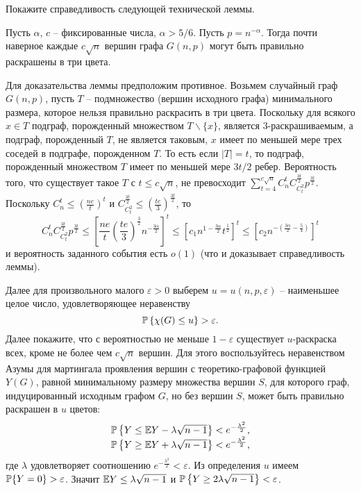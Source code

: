 \begin{ordre}
Покажите справедливость следующей технической леммы.

\begin{lemma}
Пусть $\alpha $, $c$ -- фиксированные числа, $\alpha > 5/6$. Пусть 
$p=n^{-\alpha }$. Тогда почти наверное каждые $c \sqrt n $ вершин графа 
$G(n,p)$ могут быть правильно раскрашены в три цвета.
\end{lemma}

Для доказательства леммы предположим противное. Возьмем случайный граф
$G(n,p)$, пусть $T$ -- подмножество (вершин исходного графа) минимального размера, которое нельзя правильно раскрасить в три цвета. Поскольку для всякого $x\in T$ подграф, порожденный множеством $T\backslash \{x\}$, является 3-раскрашиваемым, а подграф, порожденный $T$, не является таковым, $x$ имеет по меньшей мере трех соседей в подграфе, порожденном $T$. То есть если $\vert T\vert =t$, то подграф, порожденный множеством $T$ имеет по меньшей мере $3t/2$ ребер. Вероятность того, что существует такое $T$ с 
$t\le c\sqrt n $, не превосходит $\sum\limits_{t=4}^{c\sqrt n } {C_n^t
C_{C_t^2 }^{\frac{3t}{2}} p^{\frac{3t}{2}}} $. 
Поскольку $C_n^t \le \left( 
{\frac{ne}{t}} \right)^t$ и $C_{C_t^2 }^{\frac{3t}{2}} \le \left( 
{\frac{te}{3}} \right)^{\frac{3t}{2}}$, то 
\[
C_n^t C_{C_t^2 }^{\frac{3t}{2}} 
p^{\frac{3t}{2}}\le \left[ {\frac{ne}{t}\left( {\frac{te}{3}} 
\right)^{\frac{3}{2}}n^{-\frac{3\alpha }{2}}} \right]^t\le \left[ {c_1
n^{1-\frac{3\alpha }{2}}t^{\frac{1}{2}}} \right]^t\le \left[ {c_2 n^{-\left( 
{\frac{3\alpha }{2}-\frac{5}{4}} \right)}} \right]^t
\]
и вероятность заданного события есть $o(1)$ (что и доказывает справедливость леммы).

Далее для произвольного малого $\varepsilon >0$ выберем $u=u(n,p,\varepsilon)$ -- наименьшее целое число, удовлетворяющее неравенству
\[
\mathrm{{\mathbb P}}\left\{ {\chi (G) \leq u} \right\} > \varepsilon.
\]
Далее покажите, что с вероятностью не меньше $1-\varepsilon$ существует $u$-раскраска всех, кроме не более чем $c\sqrt n $ вершин. Для этого воспользуйтесь неравенством Азумы для мартингала проявления вершин с 
теоретико-графовой функцией $Y(G)$, равной минимальному размеру множества 
вершин $S$, для которого граф, индуцированный исходным графом $G$, но без вершин $S$, может быть правильно раскрашен в $u$ цветов:
\[
\begin{array}{l}
 \mathrm{{\mathbb P}}\left\{ {Y\le \mathrm{{\mathbb E}} Y-\lambda \sqrt {n-1} } \right\}<e^{-\frac{\lambda ^2}{2}}, 
\\ 
 \mathrm{{\mathbb P}}\left\{ {Y\ge \mathrm{{\mathbb E}} Y+\lambda \sqrt {n-1} } \right\}<e^{-\frac{\lambda ^2}{2}}, 
\\ 
 \end{array}
\]
где $\lambda $ удовлетворяет соотношению $e^{-\frac{\lambda ^2}{2}} < \varepsilon$.
Из определения $u$ имеем $\mathrm{{\mathbb P}}\{Y=0\} > \varepsilon$. Значит $\mathrm{{\mathbb E}} Y\le \lambda \sqrt {n-1} $ и $\mathrm{{\mathbb P}}\left\{ {Y\ge 2\lambda \sqrt {n-1} } \right\}<\varepsilon$.

\end{ordre}

